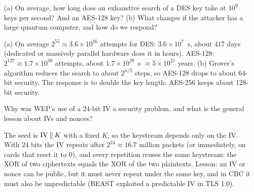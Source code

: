 \begin{exercise}
(a) On average, how long does an exhaustive search of a DES key take at $10^9$ keys per second? And an AES-128 key? (b) What changes if the attacker has a large quantum computer, and how do we respond?
\end{exercise}
\begin{solution}
(a) On average $2^{55} \approx 3.6 \times 10^{16}$ attempts for DES: $3.6 \times 10^{7}$~s, about 417 days (dedicated or massively parallel hardware does it in hours). AES-128: $2^{127} \approx 1.7 \times 10^{38}$ attempts, about $1.7 \times 10^{29}$~s $\approx 5 \times 10^{21}$ years. (b) Grover's algorithm reduces the search to about $2^{n/2}$ steps, so AES-128 drops to about 64-bit security. The response is to double the key length: AES-256 keeps about 128-bit security.
\end{solution}

\begin{exercise}
Why was WEP's use of a 24-bit IV a security problem, and what is the general lesson about IVs and nonces?
\end{exercise}
\begin{solution}
The seed is $\mathrm{IV} \mathbin{\|} K$ with a fixed $K$, so the keystream depends only on the IV. With 24 bits the IV repeats after $2^{24} \approx 16.7$ million packets (or immediately, on cards that reset it to 0), and every repetition reuses the same keystream: the XOR of two ciphertexts equals the XOR of the two plaintexts. Lesson: an IV or nonce can be public, but it must never repeat under the same key, and in CBC it must also be unpredictable (BEAST exploited a predictable IV in TLS 1.0).
\end{solution}
